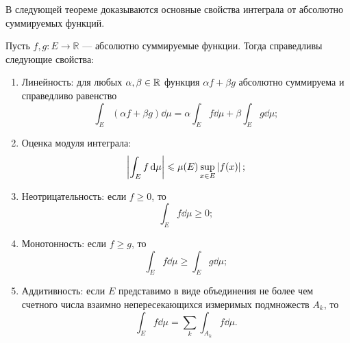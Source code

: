 В следующей теореме доказываются основные свойства интеграла от абсолютно
суммируемых функций.
\begin{theorem}
    Пусть $f, g \colon E \to \mathbb R$ --- абсолютно суммируемые функции.
    Тогда справедливы следующие свойства:
    \begin{enumerate}
        \item Линейность: для любых $\alpha, \beta \in \mathbb{R}$ функция 
            $\alpha f + \beta g$ абсолютно суммируема и справедливо равенство
            \[ \int_E (\alpha f + \beta g) \dd \mu = \alpha \int_E f \dd \mu +
            \beta \int_E g \dd \mu; \]
        
        \item Оценка модуля интеграла:
            \[ \left|\int_E f \,\mathrm{d} \mu\right| \leqslant  \mu(E) \sup_{x \in E} \left|f(x)\right|;
            \]

        \item Неотрицательность: если $f \geq 0$, то 
            \[ \int_E f \dd \mu \geq 0; \]

        \item Монотонность: если $f \geq g$, то
            \[ \int_E f \dd \mu \geq \int_E g \dd \mu; \]

        \item Аддитивность: если $E$ представимо в виде объединения не более чем
            счетного числа взаимно непересекающихся измеримых подмножеств $A_k$,
            то
            \[ \int_E f \dd \mu = \sum_k \int_{A_k} f \dd \mu. \]

    \end{enumerate}
\end{theorem}

